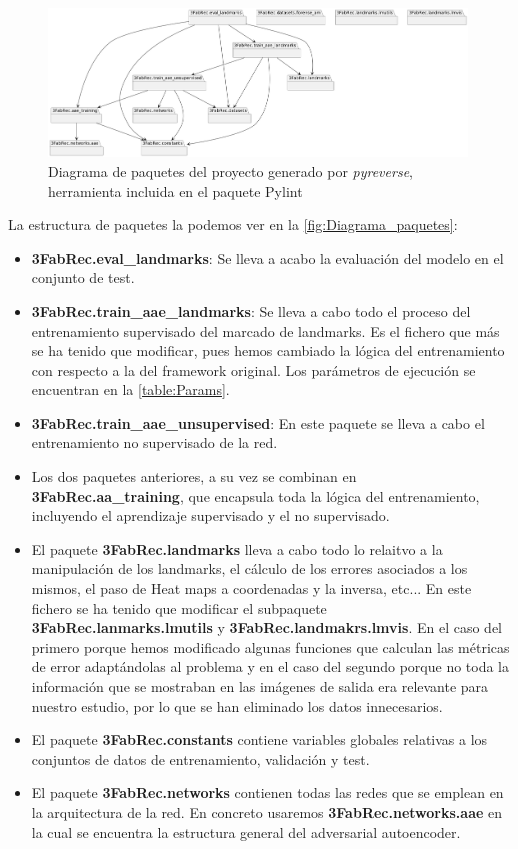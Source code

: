 \begin{figure}[!h]
    \centering
    \includegraphics[width=0.99\textwidth]{img/diagrama_paquetes_1.png}
    \caption{Diagrama de paquetes del proyecto generado por \textit{pyreverse}, herramienta incluida en el paquete Pylint}
    \label{fig:Diagrama_paquetes}
\end{figure}

\medskip

\noindent La estructura de paquetes la podemos ver en la \autoref{fig:Diagrama_paquetes}:

\begin{itemize}
    \item \textbf{3FabRec.eval\_landmarks}: Se lleva a acabo la evaluación del modelo en el conjunto de test.
    \item \textbf{3FabRec.train\_aae\_landmarks}: Se lleva a cabo todo el proceso del entrenamiento supervisado del marcado de landmarks. Es el fichero que más se ha tenido que modificar, pues hemos cambiado la lógica del entrenamiento con respecto a la del framework original. Los parámetros de ejecución se encuentran en la \autoref{table:Params}.
    \item \textbf{3FabRec.train\_aae\_unsupervised}: En este paquete se lleva a cabo el entrenamiento no supervisado de la red.
    \item Los dos paquetes anteriores, a su vez se combinan en \textbf{3FabRec.aa\_training}, que encapsula toda la lógica del entrenamiento, incluyendo el aprendizaje supervisado y el no supervisado.
    \item El paquete \textbf{3FabRec.landmarks} lleva a cabo todo lo relaitvo a la manipulación de los landmarks, el cálculo de los errores asociados a los mismos, el paso de Heat maps a coordenadas y la inversa, etc... En este fichero se ha tenido que modificar el subpaquete \textbf{3FabRec.lanmarks.lmutils} y \textbf{3FabRec.landmakrs.lmvis}. En el caso del primero porque hemos modificado algunas funciones que calculan las métricas de error adaptándolas al problema y en el caso del segundo porque no toda la información que se mostraban en las imágenes de salida era relevante para nuestro estudio, por lo que se han eliminado los datos innecesarios.
    \item El paquete \textbf{3FabRec.constants} contiene variables globales relativas a los conjuntos de datos de entrenamiento, validación y test.
    \item El paquete \textbf{3FabRec.networks} contienen todas las redes que se emplean en la arquitectura de la red. En concreto usaremos \textbf{3FabRec.networks.aae} en la cual se encuentra la estructura general del adversarial autoencoder.
\end{itemize}


